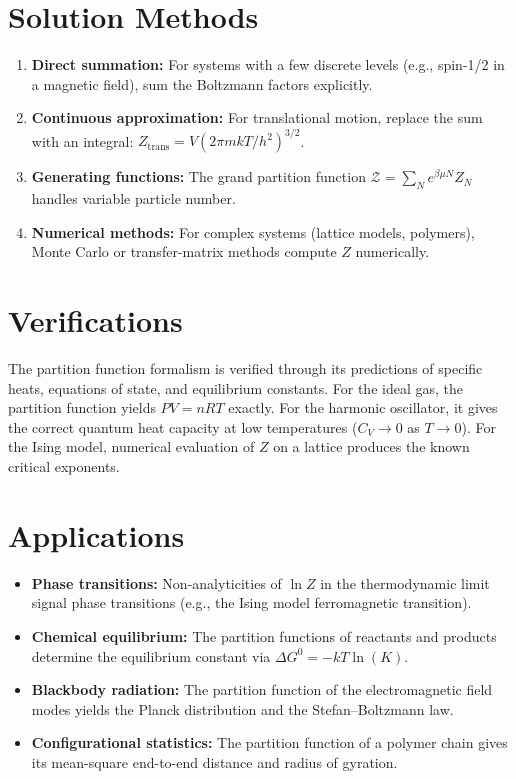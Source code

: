 \section*{Solution Methods}

\begin{enumerate}
  \item \textbf{Direct summation:} For systems with a few discrete levels (e.g., spin-1/2 in a magnetic field), sum the Boltzmann factors explicitly.
  \item \textbf{Continuous approximation:} For translational motion, replace the sum with an integral: $Z_{\text{trans}} = V(2\pi mkT/h^{2})^{3/2}$.
  \item \textbf{Generating functions:} The grand partition function $\mathcal{Z} = \sum_{N} e^{\beta\mu N}Z_{N}$ handles variable particle number.
  \item \textbf{Numerical methods:} For complex systems (lattice models, polymers), Monte Carlo or transfer-matrix methods compute $Z$ numerically.
\end{enumerate}
\section*{Verifications}

The partition function formalism is verified through its predictions of specific heats, equations of state, and equilibrium constants. For the ideal gas, the partition function yields $PV = nRT$ exactly. For the harmonic oscillator, it gives the correct quantum heat capacity at low temperatures ($C_{V} \to 0$ as $T \to 0$). For the Ising model, numerical evaluation of $Z$ on a lattice produces the known critical exponents.
\section*{Applications}

\begin{itemize}
  \item \textbf{Phase transitions:} Non-analyticities of $\ln Z$ in the thermodynamic limit signal phase transitions (e.g., the Ising model ferromagnetic transition).
  \item \textbf{Chemical equilibrium:} The partition functions of reactants and products determine the equilibrium constant via $\Delta G^{0} = -kT\ln(K)$.
  \item \textbf{Blackbody radiation:} The partition function of the electromagnetic field modes yields the Planck distribution and the Stefan--Boltzmann law.
  \item \textbf{Configurational statistics:} The partition function of a polymer chain gives its mean-square end-to-end distance and radius of gyration.
\end{itemize}
